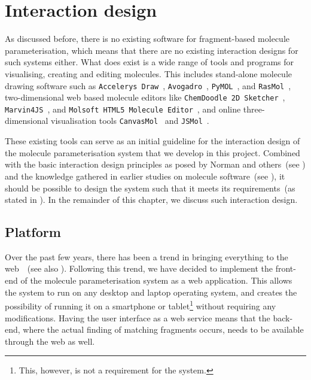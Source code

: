 \chapter{Interaction design}

As discussed before, there is no existing software for fragment-based molecule parameterisation, which means that there are no existing interaction designs for such systems either. What does exist is a wide range of tools and programs for visualising, creating and editing molecules. This includes stand-alone molecule drawing software such as \verb|Accelerys Draw|~\cite{accelrys2012accelrys}, \verb|Avogadro|~\cite{hanwell2012avogadro}, \verb|PyMOL|~\cite{delano2002pymol}, and \verb|RasMol|~\cite{pembroke2000bio}, two-dimensional web based molecule editors like \verb|ChemDoodle 2D Sketcher|~\cite{ichemlabs2013chemdoodle}, \verb|Marvin4JS|~\cite{chemxon2013marvin}, and \verb|Molsoft HTML5 Molecule Editor|~\cite{molsoft2012molsoft}, and online three-dimensional visualisation tools \verb|CanvasMol|~\cite{altered2013canvasmol} and \verb|JSMol|~\cite{hanson2013jsmol}.

These existing tools can serve as an initial guideline for the interaction design of the molecule parameterisation system that we develop in this project. Combined with the basic interaction design principles as posed by Norman and others~(see ) and the knowledge gathered in earlier studies on molecule software~(see ), it should be possible to design the system such that it meets its requirements~(as stated in ). In the remainder of this chapter, we discuss such interaction design.



\section{Platform}
Over the past few years, there has been a trend in bringing everything to the web~\cite{ertl2010molecular}~(see also ). Following this trend, we have decided to implement the front-end of the molecule parameterisation system as a web application. This allows the system to run on any desktop and laptop operating system, and creates the possibility of running it on a smartphone or tablet\footnote{This, however, is not a requirement for the system.} without requiring any modifications. Having the user interface as a web service means that the back-end, where the actual finding of matching fragments occurs, needs to be available through the web as well.



